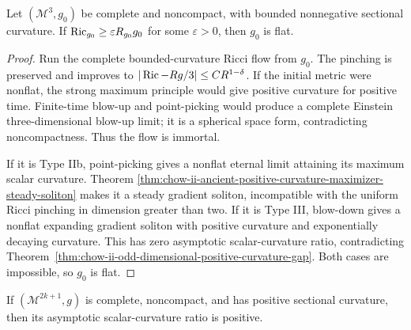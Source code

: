 \begin{theorem}
\label{thm:chow-ii-pinched-noncompact-three-manifold-flat}


Let \((\mathcal M^3,g_0)\) be complete and noncompact, with bounded
nonnegative sectional curvature.  If
\(\operatorname{Ric}_{g_0}\ge\varepsilon R_{g_0}g_0\) for some \(\varepsilon>0\), then
\(g_0\) is flat.
\end{theorem}
\begin{proof}
\sketch Run the complete bounded-curvature Ricci flow from \(g_0\).  The pinching is
preserved and improves to
\(|\operatorname{Ric}-Rg/3|\le CR^{1-\delta}\).  If the initial metric were nonflat, the
strong maximum principle would give positive curvature for positive time.
Finite-time blow-up and point-picking would produce a complete Einstein
three-dimensional blow-up limit; it is a spherical space form, contradicting
noncompactness.  Thus the flow is immortal.

If it is Type IIb, point-picking gives a nonflat eternal limit attaining its
maximum scalar curvature.  Theorem
\ref{thm:chow-ii-ancient-positive-curvature-maximizer-steady-soliton} makes it
a steady gradient soliton, incompatible with the uniform Ricci pinching in
dimension greater than two.  If it is Type III, blow-down gives a nonflat
expanding gradient soliton with positive curvature and exponentially decaying
curvature.  This has zero asymptotic scalar-curvature ratio, contradicting
Theorem~\ref{thm:chow-ii-odd-dimensional-positive-curvature-gap}.  Both cases
are impossible, so \(g_0\) is flat.
\end{proof}

\begin{theorem}
\label{thm:chow-ii-odd-dimensional-positive-curvature-gap}

If \((\mathcal M^{2k+1},g)\) is complete, noncompact, and has positive
sectional curvature, then its asymptotic scalar-curvature ratio is positive.
\end{theorem}

